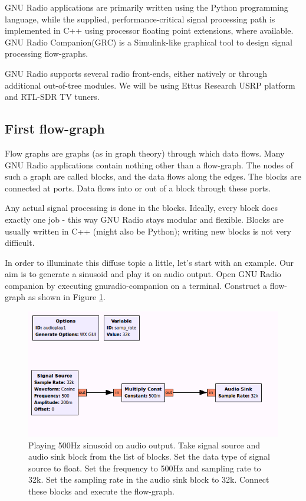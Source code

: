 \documentclass[a4paper,10pt]{article}
\begin{document}
GNU Radio applications are primarily written using the Python programming language, 
while the supplied, performance-critical signal processing path is implemented in C++
using processor floating point extensions, where available.
GNU Radio Companion(GRC) is a Simulink-like graphical tool to design signal processing flow-graphs.

GNU Radio supports several radio front-ends, either natively or through additional out-of-tree modules.
We will be using Ettus Research USRP platform and RTL-SDR TV tuners.

\subsection{First flow-graph}
Flow graphs are graphs (as in graph theory) through which data flows.
Many GNU Radio applications contain nothing other than a flow-graph.
The nodes of such a graph are called blocks, and the data flows along the edges.
The blocks are connected at ports. Data flows into or out of a block through these ports.

Any actual signal processing is done in the blocks.
Ideally, every block does exactly one job - this way GNU Radio stays modular and flexible.
Blocks are usually written in C++ (might also be Python); writing new blocks is not very difficult.

In order to illuminate this diffuse topic a little, let's start with an example.
Our aim is to generate a sinusoid and play it on audio output.
Open GNU Radio companion by executing gnuradio-companion on a terminal. 
Construct a flow-graph as shown in Figure \ref{fig:audio-play1}.

\begin{figure}[b]
\centering
 \includegraphics[scale=0.40]{figures/audio-play1.png}
 \caption{Playing 500Hz sinusoid on audio output.
 Take signal source and audio sink block from the list of blocks.
 Set the data type of signal source to float.
 Set the frequency to 500Hz and sampling rate to 32k.
 Set the sampling rate in the audio sink block to 32k.
 Connect these blocks and execute the flow-graph.\label{fig:audio-play1}}
\end{figure}
 
\end{document}
